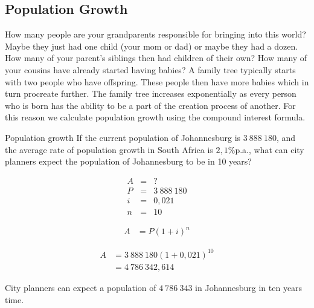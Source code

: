 \subsection{Population Growth}

How many people are your grandparents responsible for bringing into this world? Maybe they just had one child (your mom or dad) or maybe they had a dozen. How many of your parent’s siblings then had children of their own? How many of your cousins have already started having babies? A family tree typically starts with two people who have offspring. These people then have more babies which in turn procreate further. The family tree increases exponentially as every person who is born has the ability to be a part of the creation process of another. For this reason we calculate population growth using the compound interest formula.


\begin{wex}{Population growth}
    {If the current population of Johannesburg is $3~888~180$, and the average rate of population growth in South Africa is $2,1\%$p.a., what can city planners expect the population of Johannesburg to be in 10 years?}{
    
    \begin{eqnarray*}
	A &=& ?\\
	P &=& 3~888~180\\
	i &=& 0,021\\
	n &=& 10
    \end{eqnarray*}

    \begin{align*}
	A &= P(1 + i)^n
    \end{align*}

    \begin{align*}
	A &= 3~888~180(1 + 0,021)^{10}\\
	  &= 4~786~342,614
    \end{align*}

    City planners can expect a population of $4~786~343$ in Johannesburg in ten years time.
    }
\end{wex}


